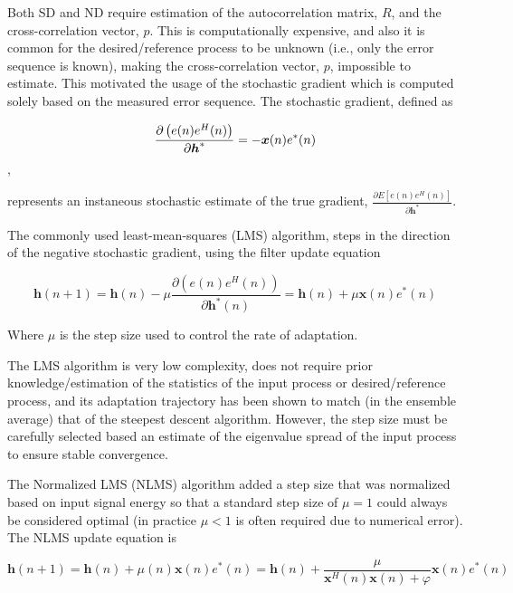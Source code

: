 Both SD and ND require estimation of the autocorrelation matrix, $R$, and the cross-correlation vector, $p$. This is computationally expensive, and also it is common for the desired/reference process to be unknown (i.e., only the error sequence is known), making the cross-correlation vector, $p$, impossible to estimate. This motivated the usage of the stochastic gradient which is computed solely based on the measured error sequence. The stochastic gradient, defined as

\begin{equation}
	\frac{\partial \left(e(n)e^H(n)\right)}{\partial \boldsymbol{h}^*} = - \boldsymbol{x}(n)e^*(n) \\
\end{equation},

\noindent
represents an instaneous stochastic estimate of the true gradient, $ \frac{\partial E\left[e(n)e^H(n)\right]}{\partial \boldsymbol{h}^*} $.

The commonly used least-mean-squares (LMS) algorithm, steps in the direction of the negative stochastic gradient, using the filter update equation

\begin{equation}
	\boldsymbol{h}(n+1) =
	 \boldsymbol{h}(n) - \mu 	\frac{\partial \left(e(n)e^H(n)\right)}{\partial \boldsymbol{h}^*(n)} =
	 \boldsymbol{h}(n) + \mu \boldsymbol{x}(n)e^*(n)
\end{equation}

\noindent
Where $\mu$ is the step size used to control the rate of adaptation. 

The LMS algorithm is very low complexity, does not require prior knowledge/estimation of the statistics of the input process or desired/reference process, and its adaptation trajectory has been shown to match (in the ensemble average) that of the steepest descent algorithm. However, the step size must be carefully selected based an estimate of the eigenvalue spread of the input process to ensure stable convergence.

The Normalized LMS (NLMS) algorithm added a step size that was normalized based on input signal energy so that a standard step size of $\mu=1$ could always be considered optimal (in practice $\mu < 1$ is often required due to numerical error). The NLMS update equation is

\begin{equation}
	\boldsymbol{h}(n+1) =
	\boldsymbol{h}(n) + \mu (n)\boldsymbol{x}(n)e^*(n) = 
	\boldsymbol{h}(n) + \frac{\mu}{\boldsymbol{x}^H(n)\boldsymbol{x}(n) + \varphi} \boldsymbol{x}(n)e^*(n)
\end{equation}

